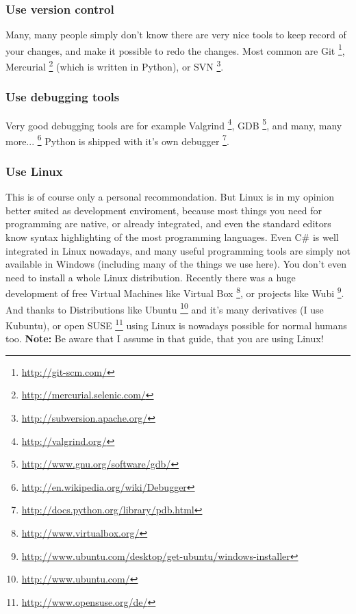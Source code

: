 \documentclass[letterpaper,10pt,english]{manual}
\begin{document}
\subsubsection{Use version control}

Many, many people simply don't know there are very nice
tools to keep record of your changes, and make it possible
to redo the changes. Most common are Git \footnote{
\href{http://git-scm.com/}{http://git-scm.com/}
}, Mercurial \footnote{
\href{http://mercurial.selenic.com/}{http://mercurial.selenic.com/}
} (which is written in Python),
or SVN \footnote{
\href{http://subversion.apache.org/}{http://subversion.apache.org/}
}.


\subsubsection{Use debugging tools}

Very good debugging tools are for example Valgrind \footnote{
\href{http://valgrind.org/}{http://valgrind.org/}
}, GDB \footnote{
\href{http://www.gnu.org/software/gdb/}{http://www.gnu.org/software/gdb/}
},
and many, many more... \footnote{
\href{http://en.wikipedia.org/wiki/Debugger}{http://en.wikipedia.org/wiki/Debugger}
}
Python is shipped with it's own debugger \footnote{
\href{http://docs.python.org/library/pdb.html}{http://docs.python.org/library/pdb.html}
}.


\subsubsection{Use Linux}

This is of course only a personal recommondation. But Linux is in my opinion better
suited as development enviroment, because most things you need for programming are native, or
already integrated, and even the standard editors know syntax highlighting of the most programming
languages. Even C\# is well integrated in Linux nowadays, and many useful programming tools are simply not
available in Windows (including many of the things we use here).
You don't even need to install a whole Linux distribution. Recently there was a huge development of free
Virtual Machines like Virtual Box \footnote{
\href{http://www.virtualbox.org/}{http://www.virtualbox.org/}
}, or projects like Wubi \footnote{
\href{http://www.ubuntu.com/desktop/get-ubuntu/windows-installer}{http://www.ubuntu.com/desktop/get-ubuntu/windows-installer}
}. And thanks to Distributions like
Ubuntu \footnote{
\href{http://www.ubuntu.com/}{http://www.ubuntu.com/}
}  and it's many derivatives (I use Kubuntu), or open SUSE \footnote{
\href{http://www.opensuse.org/de/}{http://www.opensuse.org/de/}
} using Linux is nowadays possible for
normal humans too. \textbf{Note:} Be aware that I assume in that guide,
that you are using Linux!
\end{document}
